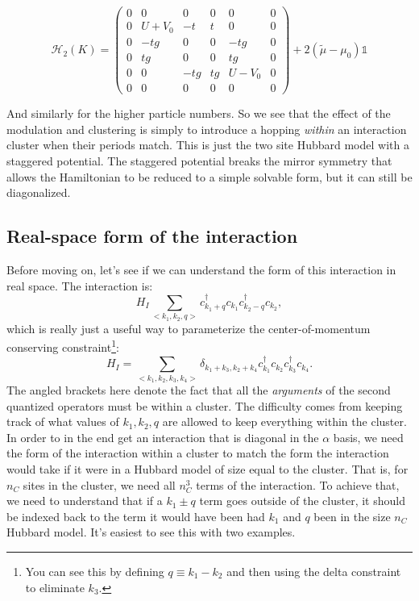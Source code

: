 \documentclass[12pt]{article}
\numberwithin{equation}{section}
\begin{document}
\[
\mathcal{H}_2(K)=\left(
\begin{array}{c|cccc|c}  %
  0 & 0 & 0   & 0  & 0   & 0 \\ \hline
  0 & U+V_0 & -t  &  t & 0   & 0 \\
  0 & -tg & 0   & 0  & -tg & 0 \\
  0 &  tg & 0   & 0  &  tg & 0 \\
  0 & 0   & -tg & tg & U-V_0 & 0 \\ \hline
  0 & 0   & 0   & 0  & 0   & 0
\end{array}
\right)
+2(\tilde \mu-\mu_0)\mathds{1}
\]

And similarly for the higher particle numbers. So we see that the effect of the modulation and clustering is simply to introduce a hopping \textit{within} an interaction cluster when their periods match. This is just the two site Hubbard model with a staggered potential. The staggered potential breaks the mirror symmetry that allows the Hamiltonian to be reduced to a simple solvable form, but it can still be diagonalized.
\subsection{Real-space form of the interaction}
Before moving on, let's see if we can understand the form of this interaction in real space. The interaction is:
\begin{equation}
    H_{I}\sum_{<k_1,k_2,q>}c^\dagger_{k_1+q}c_{k_1}c^\dagger_{k_2-q}c_{k_2},
\end{equation}
which is really just a useful way to parameterize the center-of-momentum conserving constraint\footnote{You can see this by defining $q\equiv k_1-k_2$ and then using the delta constraint to eliminate $k_3$.}:
\begin{equation}
    H_{I}=\sum_{<k_1,k_2,k_3,k_4>}\delta_{k_1+k_3,k_2+k_4}c^\dagger_{k_1}c_{k_2}c^\dagger_{k_3}c_{k_4}.
\end{equation}
The angled brackets here denote the fact that all the \textit{arguments} of the second quantized operators must be within a cluster. 
The difficulty comes from keeping track of what values of $k_1,k_2,q$ are allowed to keep everything within the cluster. 
In order to in the end get an interaction that is diagonal in the $\alpha$ basis, we need the form of the interaction within a cluster to match the form the interaction would take if it were in a Hubbard model of size equal to the cluster. 
That is, for $n_C$ sites in the cluster, we need all $n_C^3$ terms of the interaction. 
To achieve that, we need to understand that if a $k_1\pm q$ term goes outside of the cluster, it should be indexed back to the term it would have been had $k_1$ and $q$ been in the size $n_C$ Hubbard model.
It's easiest to see this with two examples. \\
\end{document}
